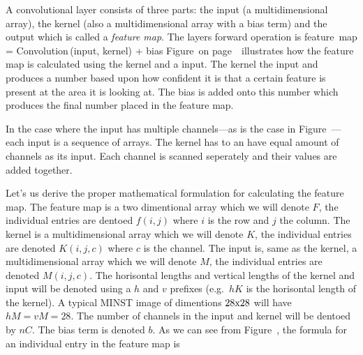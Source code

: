 \startsubsection[title=The convolutional layer]
A convolutional layer consists of three parts: the input (a multidimensional array), the kernel (also a multidimensional array with a bias term) and the output which is called a {\em feature map}.
The layers forward operation is
\startformula
{\rm feature\ map} = {\rm Convolution}\,({\rm input}, {\rm kernel}) + {\rm bias}
\stopformula
Figure~ on page~ illustrates how the feature map is calculated using the kernel and a input.
The kernel  the input and produces a number based upon how confident it is that a certain feature is present at the area it is looking at.
The bias is added onto this number which produces the final number placed in the feature map.

\startplacefigure[reference=conv-operation,
                   title={The basic forward operation of a convolutional layer},
                   location=top]
{}{}
{}{}
{}{}
{}{}
{}{}
{}{}
{}{}
{}{}
\stopcombination
\stopplacefigure



In the case where the input has multiple channels---as is the case in Figure~---each input is a sequence of arrays.
The kernel has to an have equal amount of channels as its input.
Each channel is scanned seperately and their values are added together.

Let's us derive the proper mathematical formulation for calculating the feature map.
The feature map is a two dimentional array which we will denote $F$, the individual entries are dentoed $f(i,j)$ where $i$ is the row and $j$ the column.
The kernel is a multidimensional array which we will denote $K$, the individual entries are denoted $K(i,j,c)$ where $c$ is the channel.
The input is, same as the kernel, a multidimensional array which we will denote $M$, the individual entries are denoted $M(i,j,c)$.
The horisontal lengths and vertical lengths of the kernel and input will be denoted using a $h$ and $v$ prefixes (e.g.\ $hK$ is the horisontal length of the kernel).
A typical MINST image of dimentions $28{\rm x}28$ will have $hM = vM = 28$.
The number of channels in the input and kernel will be dentoed by $nC$.
The bias term is denoted $b$.
As we can see from Figure~, the formula for an individual entry in the feature map is

